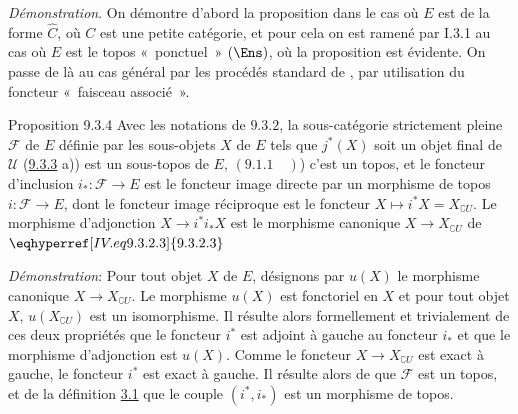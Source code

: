 \noindent \emph{Démonstration}. On démontre d'abord la proposition
dans le cas où $E$ est de la forme $\widehat{C}$, où $C$ est une
petite catégorie, et pour cela on est ramené par I.3.1 au cas où $E$
est le topos « ponctuel »  $(\Ens)$, où la proposition est
évidente. On passe de là au cas général par les
procédés standard de
, par utilisation du foncteur « faisceau associé ».

\begin{enonce*}{Proposition 9.3.4}
Avec les notations de $\hyperref[IV.subsubsec9.3.2]{9.3.2}$, la sous-catégorie
strictement pleine $\mathcal{F}$ de $E$ définie par les sous-objets
$X$ de $E$ tels que $j^{\ast}(X)$ soit un objet final de
$\mathcal{U}$ {\rm (\cf \hyperref[IV.prop9.3.3]{9.3.3} a))} est un sous-topos de
$E$, \ie $(\hyperref[IV.def9.1.1]{9.1.1}\quad )$) c'est un topos, et le foncteur
d'inclusion $i_{\ast}:\mathcal{F}\rightarrow E$ est le foncteur
image directe par un morphisme de topos $i:\mathcal{F}\rightarrow
E$, dont le foncteur image réciproque est le foncteur $X\mapsto
i^{\ast}X=X_{\complement U}$. Le morphisme d'adjonction
$X\rightarrow i^{\ast}i_{\ast}X$ est le morphisme canonique
$X\rightarrow X_{\complement U}$ de $\eqhyperref[IV.eq9.3.2.3]{9.3.2.3}$
\end{enonce*}

\noindent \emph{Démonstration}: Pour tout objet $X$ de $E$,
désignons par $u(X)$ le morphisme canonique $X\rightarrow
X_{\complement U}$. Le morphisme $u(X)$ est fonctoriel en $X$ et
pour tout objet $X$, $u(X_{\complement U})$ est un isomorphisme. Il
résulte alors formellement et trivialement de ces deux propriétés
que le foncteur $i^{\ast}$ est adjoint à gauche au foncteur
$i_{\ast}$ et que le morphisme d'adjonction est $u(X)$. Comme le
foncteur $X\rightarrow X_{\complement U}$ est exact à gauche, le
foncteur $i^{\ast}$ est exact à gauche. Il résulte alors de
 que $\mathcal{F}$ est un topos, et de la
définition \hyperref[IV.def3.1]{3.1} que le couple $(i^{\ast}, i_{\ast})$ est
un morphisme de topos.

\setcounter{subsubsection}{4}

